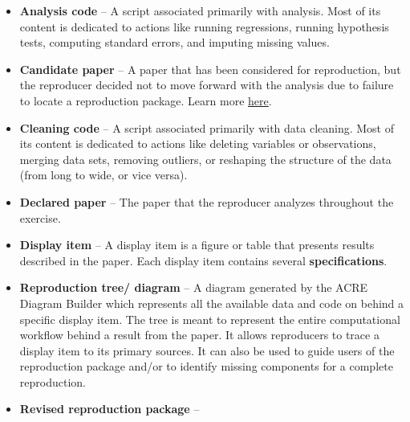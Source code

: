 \documentclass[
]{book}
\providecommand{\tightlist}{%
  \setlength{\itemsep}{0pt}\setlength{\parskip}{0pt}}
\begin{document}
\begin{itemize}
\tightlist
\item
  \textbf{Analysis code} -- A script associated primarily with analysis. Most of its content is dedicated to actions like running regressions, running hypothesis tests, computing standard errors, and imputing missing values.\\
\item
  \textbf{Candidate paper} -- A paper that has been considered for reproduction, but the reproducer decided not to move forward with the analysis due to failure to locate a reproduction package. Learn more \href{https://bitss.github.io/ACRE/scoping.html\#from-candidate-to-declared-paper}{here}.
\item
  \textbf{Cleaning code} -- A script associated primarily with data cleaning. Most of its content is dedicated to actions like deleting variables or observations, merging data sets, removing outliers, or reshaping the structure of the data (from long to wide, or vice versa).\\
\item
  \textbf{Declared paper} -- The paper that the reproducer analyzes throughout the exercise.
\item
  \textbf{Display item} -- A display item is a figure or table that presents results described in the paper. Each display item contains several \textbf{specifications}. \\
\item
  \textbf{Reproduction tree/ diagram} -- A diagram generated by the ACRE Diagram Builder which represents all the available data and code on behind a specific display item. The tree is meant to represent the entire computational workflow behind a result from the paper. It allows reproducers to trace a display item to its primary sources. It can also be used to guide users of the reproduction package and/or to identify missing components for a complete reproduction.
\item
  \textbf{Revised reproduction package} --
\end{itemize}

  
\end{document}
